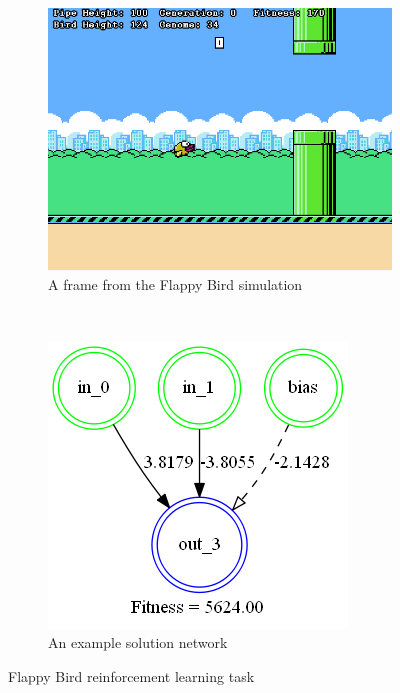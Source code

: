 \documentclass[twocolumn,letterpaper]{article}
\begin{document}
\begin{figure}[t]
	\centering
	\begin{subfigure}[b]{0.45\textwidth}
		\includegraphics[width=\textwidth]{images/flappy.png}
		\caption{A frame from the Flappy Bird simulation}
	\end{subfigure}
	~
	\begin{subfigure}[b]{0.3\textwidth}
		\includegraphics[width=\textwidth]{images/flappy_network.png}
		\caption{An example solution network}
		\label{fig:flappy_network}
	\end{subfigure}
	\caption{Flappy Bird reinforcement learning task}
	\label{fig:flappy}
\end{figure}
\end{document}
